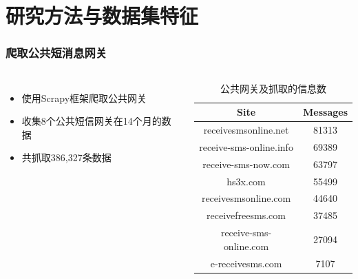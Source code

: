 \documentclass[10pt,aspectratio=43,mathserif]{beamer}
\begin{document}
\section[方法]{研究方法与数据集特征}
		\begin{frame}
		  \frametitle{\textbf{爬取公共短消息网关}}
            \begin{columns}
                \footnotesize
                \begin{itemize}
                  \item 使用Scrapy框架爬取公共网关
                  \item 收集8个公共短信网关在14个月的数据
                  \item 共抓取386,327条数据
                \end{itemize}

                \begin{table}
                \caption{公共网关及抓取的信息数}
                \label{table1:gateways}
                \centering
                \footnotesize
                \begin{tabular}{|c|c|}
                \hline
                \textbf{Site}           & \textbf{Messages}\\
                \hline
                receivesmsonline.net    &81313\\
                \hline
                receive-sms-online.info &69389\\
                \hline
                receive-sms-now.com     &63797\\
                \hline
                 hs3x.com               &55499\\
                \hline
                receivesmsonline.com    &44640\\
                \hline
                receivefreesms.com      &37485\\
                \hline
                receive-sms-online.com  &27094\\
                \hline
                 e-receivesms.com       &7107\\
                \hline
                \end{tabular}
                \end{table}
            \end{columns}

		\end{frame}
\end{document}
